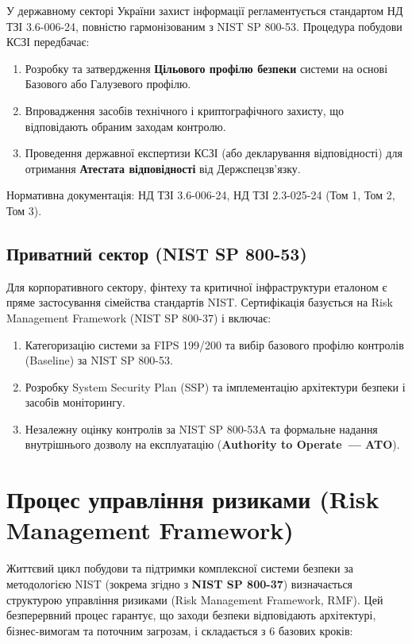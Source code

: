 У державному секторі України захист інформації регламентується стандартом НД ТЗІ 3.6-006-24,
повністю гармонізованим з NIST SP 800-53. Процедура побудови КСЗІ передбачає:

\begin{enumerate}
    \item Розробку та затвердження \textbf{Цільового профілю безпеки} системи на основі Базового
          або Галузевого профілю.
    \item Впровадження засобів технічного і криптографічного захисту, що відповідають обраним
          заходам контролю.
    \item Проведення державної експертизи КСЗІ (або декларування відповідності) для отримання
          \textbf{Атестата відповідності} від Держспецзв'язку.
\end{enumerate}

Нормативна документація: НД ТЗІ 3.6-006-24, НД ТЗІ 2.3-025-24 (Том 1, Том 2, Том 3).

\subsection{Приватний сектор (NIST SP 800-53)}

Для корпоративного сектору, фінтеху та критичної інфраструктури еталоном є пряме застосування
сімейства стандартів NIST. Сертифікація базується на Risk Management Framework (NIST SP 800-37)
і включає:

\begin{enumerate}
    \item Категоризацію системи за FIPS 199/200 та вибір базового профілю контролів (Baseline)
          за NIST SP 800-53.
    \item Розробку System Security Plan (SSP) та імплементацію архітектури безпеки і засобів
          моніторингу.
    \item Незалежну оцінку контролів за NIST SP 800-53A та формальне надання внутрішнього дозволу
          на експлуатацію (\textbf{Authority to Operate~--- ATO}).
\end{enumerate}

\section{Процес управління ризиками (Risk Management Framework)}

Життєвий цикл побудови та підтримки комплексної системи безпеки за методологією NIST (зокрема згідно з \textbf{NIST SP 800-37}) визначається структурою управління ризиками (Risk Management Framework, RMF). Цей безперервний процес гарантує, що заходи безпеки відповідають архітектурі, бізнес-вимогам та поточним загрозам, і складається з 6 базових кроків:

